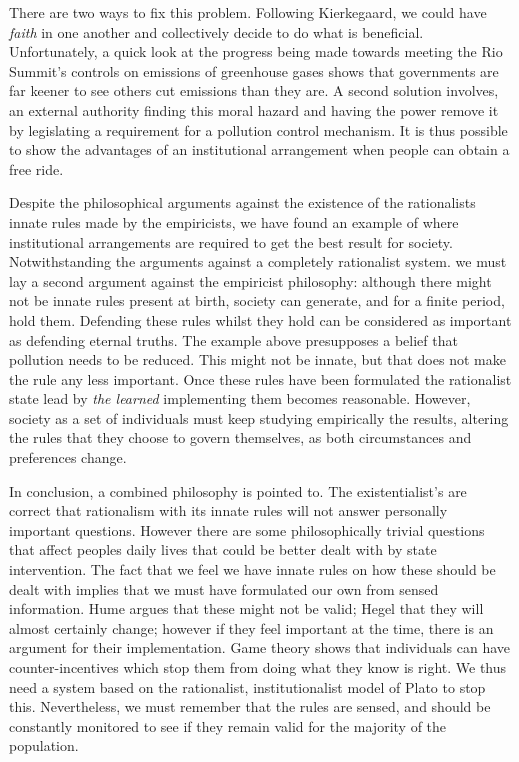 There are two ways to fix this problem. Following Kierkegaard, we could have \textit{faith} in one another and collectively decide to do what is beneficial. Unfortunately, a quick look at the progress being made towards meeting the Rio Summit's controls on emissions of greenhouse gases shows that governments are far keener to see others cut emissions than they are. A second solution involves, an external authority finding this moral hazard and having the power remove it by legislating a requirement for a pollution control mechanism. It is thus possible to show the advantages of an institutional arrangement when people can obtain a free ride.

Despite the philosophical arguments against the existence of the rationalists innate rules made by the empiricists, we have found an example of where institutional arrangements are required to get the best result for society. Notwithstanding the arguments against a completely rationalist system. we must lay a second argument against the empiricist philosophy: although there might not be innate rules present at birth, society can generate, and for a finite period, hold them. Defending these rules whilst they hold can be considered as important as defending eternal truths. The example above presupposes a belief that pollution needs to be reduced. This might not be innate, but that does not make the rule any less important. Once these rules have been formulated the rationalist state lead by \textit{the learned} implementing them becomes reasonable. However, society as a set of individuals must keep studying empirically the results, altering the rules that they choose to govern themselves, as both circumstances and preferences change.

In conclusion, a combined philosophy is pointed to. The existentialist's are correct that rationalism with its innate rules will not answer personally important questions. However there are some philosophically trivial questions that affect peoples daily lives that could be better dealt with by state intervention. The fact that we feel we have innate rules on how these should be dealt with implies that we must have formulated our own from sensed information. Hume argues that these might not be valid; Hegel that they will almost certainly change; however if they feel important at the time, there is an argument for their implementation. Game theory shows that individuals can have counter-incentives which stop them from doing what they know is right. We thus need a system based on the rationalist, institutionalist model of Plato to stop this. Nevertheless, we must remember that the rules are sensed, and should be constantly monitored to see if they remain valid for the majority of the population.